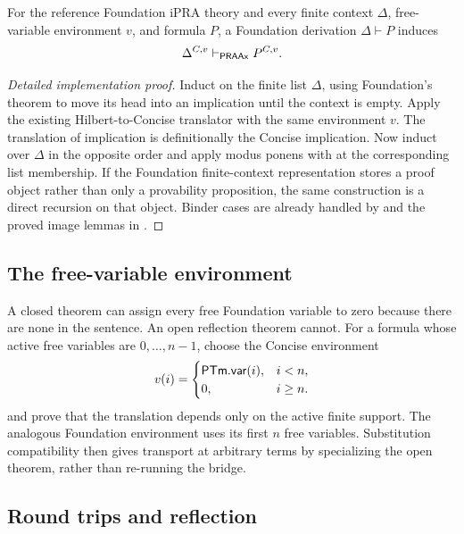 \begin{theorem}
\label{thm:open-bridge}
For the reference Foundation iPRA theory and every finite context \(\Delta\),
free-variable environment \(v\), and formula \(P\), a Foundation derivation
\(\Delta\vdash P\) induces
\[
      \Delta^{C,v}\mathrel{\vdash_{\mathsf{PRAAx}}} P^{C,v}.
\]
\end{theorem}

\begin{proof}[Detailed implementation proof]
Induct on the finite list \(\Delta\), using Foundation's  theorem
to move its head into an implication until the context is empty.  Apply the
existing Hilbert-to-Concise translator with the same environment \(v\).  The
translation of implication is definitionally the Concise implication.  Now
induct over \(\Delta\) in the opposite order and apply modus ponens with
 at the corresponding list membership.  If the Foundation
finite-context representation stores a proof object rather than only a
provability proposition, the same construction is a direct recursion on that
object.  Binder cases are already handled by  and the
proved image lemmas in .
\end{proof}

\subsection{The free-variable environment}

A closed theorem can assign every free Foundation variable to zero because
there are none in the sentence.  An open reflection theorem cannot.  For a
formula whose active free variables are \(0,\ldots,n-1\), choose the Concise
environment
\[
        v(i)=\begin{cases}
          \mathsf{PTm}.\mathsf{var}(i),&i<n,\\
          0,&i\ge n.
        \end{cases}
\]
and prove that the translation depends only on the active finite support.
The analogous Foundation environment uses its first \(n\) free variables.
Substitution compatibility then gives transport at arbitrary terms by
specializing the open theorem, rather than re-running the bridge.

\subsection{Round trips and reflection}


